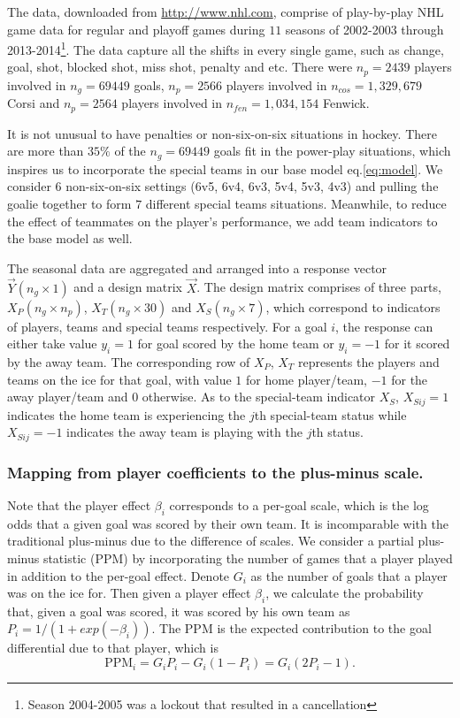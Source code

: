 The data, downloaded from \url{http://www.nhl.com}, comprise of play-by-play NHL game data for regular and playoff games during $11$ seasons of 2002-2003 through 2013-2014\footnote{Season 2004-2005 was a lockout that resulted in a cancellation}. The data capture all the shifts in every single game, such as change, goal, shot, blocked shot, miss shot, penalty and etc. There were $n_p=2439$ players involved in $n_g=69449$ goals, $n_p=2566$ players involved in $n_{cos}=1,329,679$ Corsi and $n_p=2564$ players involved in $n_{fen}=1,034,154$ Fenwick.

It is not unusual to have penalties or non-six-on-six situations in hockey. There are more than $35\%$ of the $n_g=69449$ goals fit in the power-play situations, which inspires us to incorporate the special teams in our base model eq.\eqref{eq:model}. We consider $6$ non-six-on-six settings (6v5, 6v4, 6v3, 5v4, 5v3, 4v3) and pulling the goalie together to form $7$ different special teams situations. Meanwhile, to reduce the effect of teammates on the player's performance, we add team indicators to the base model as well.


The seasonal data are aggregated and arranged into a response vector $\vec{Y}(n_g \times 1)$ and a design matrix $\vec{X}$. The design matrix comprises of three parts, $X_P(n_g\times n_p)$, $X_T(n_g\times 30)$ and $X_S(n_g\times 7)$, which correspond to indicators of players, teams and special teams respectively. For a goal $i$, the response can either take value $y_i=1$ for goal scored by the home team or $y_i={-1}$ for it scored by the away team. The corresponding row of $X_P$, $X_T$ represents the players and teams on the ice for that goal, with value $1$ for home player/team, ${-1}$ for the away player/team and $0$ otherwise. As to the special-team indicator $X_S$, $X_{Sij}=1$ indicates the home team is experiencing the $j$th special-team status while $X_{Sij}=-1$ indicates the away team is playing with the $j$th status. 

\subsubsection{Mapping from player coefficients to the plus-minus scale.}
\label{sec:ppm.mapping}
Note that the player effect $\beta_i$ corresponds to a per-goal scale, which is the log odds that a given goal was scored by their own team. It is incomparable with the traditional plus-minus due to the difference of scales. We consider a partial plus-minus statistic (PPM) by incorporating the number of games that a player played in addition to the per-goal effect. Denote $G_i$ as the number of goals that a player was on the ice for. Then given a player effect $\beta_i$, we calculate the probability that, given a goal was scored, it was scored by his own team as $P_i=1/(1+exp(-\beta_i))$. The PPM is the expected contribution to the goal differential due to that player, which is 
\begin{equation}
\text{PPM}_i = G_iP_i-G_i(1-P_i)=G_i(2P_i-1).
\label{eq:ppm}
\end{equation}


